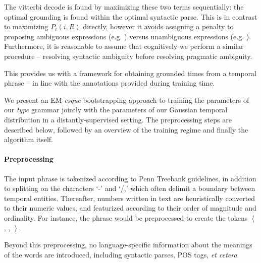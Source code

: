 The vitterbi decode is found by maximizing these two terms sequentially:
	the optimal grounding is found within the optimal syntactic parse.
This is in contrast to maximizing $P_t(i,R)$ directly, however it avoids
	assigning a penalty to proposing ambiguous expressions (e.g. )
	versus unambiguous expressions (e.g. ).
Furthermore, it is reasonable to assume that cognitively we perform a
	similar procedure -- resolving syntactic ambiguity before resolving
	pragmatic ambiguity.

This provides us with a framework for obtaining grounded times from a
	temporal phrase -- in line with the annotations provided during training
	time.


We present an EM-\textit{esque} bootstrapping approach to training the 
	parameters of our \textit{type} grammar jointly with the parameters of our 
	Gaussian temporal distribution in a distantly-supervised setting.
The preprocessing steps are described below, followed by an overview
	of the training regime and finally the algorithm itself.

\paragraph{Preprocessing}
The input phrase is tokenized according to Penn Treebank guidelines,
	in addition to splitting on the characters `-' and `/,' which
	often delimit a boundary between temporal entities.
Thereafter, numbers written in text are heuristically converted to their
	numeric values, and featurized according to their order of magnitude
	and ordinality.
For instance, the phrase  would be preprocessed to create the
	tokens $\left<\right.$  , \tp{-} ,  
		$\left.\right>$.

Beyond this preprocessing, no language-specific information about the meanings
	of the words are introduced, including syntactic parses, POS tags,
	\textit{et cetera}.



